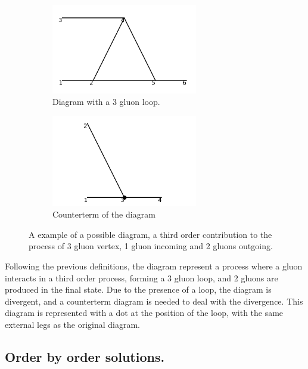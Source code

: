 \documentclass[11pt,a4paper,twoside,pdf]{article}
\numberwithin{equation}{section}
\begin{document}
\begin{figure}[h!]
    \centering
    \begin{subfigure}[t]{0.5\textwidth}
        \centering
        \includegraphics[width=0.7\textwidth]{plots/order3/order3_1to2/1.png}
        \caption{Diagram with a 3 gluon loop.}
    \end{subfigure}%
    \begin{subfigure}[t]{0.5\textwidth}
        \centering
        \includegraphics[width=0.7\textwidth]{plots/order3/order3_1to2/counterterms/1.png}
        \caption{Counterterm of the diagram}
    \end{subfigure}
    \caption{A example of a possible diagram, a third order contribution to the 
    process of 3 gluon vertex, 1 gluon incoming and 2 gluons outgoing. }
    \label{fig:example_diagram}
\end{figure}

Following the previous definitions, the diagram represent a process where a gluon
interacts in a third order process, forming a 3 gluon loop, and 2 gluons are 
produced in the final state. Due to the presence of a loop, the diagram is
divergent, and a counterterm diagram is needed to deal with the divergence. This 
diagram is represented with a dot at the position of the loop, with the same 
external legs as the original diagram. 

\subsection{Order by order solutions.}
\end{document}
